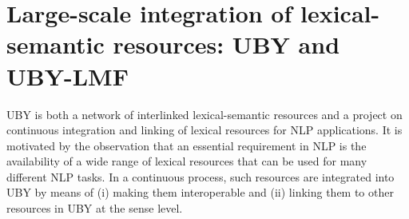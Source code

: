 \section{Large-scale integration of lexical-semantic resources: UBY and UBY-LMF}


\noindent
UBY is both a network of interlinked lexical-semantic resources
and a project on continuous integration and linking of lexical resources for NLP applications.
 It is motivated by the
observation that an essential requirement in NLP is the availability of a wide range of lexical resources that
can be used for many different NLP tasks. In a continuous process, such resources
are integrated into UBY by means of (i) making them interoperable  and (ii)
linking them to other resources in UBY at the sense level.

%

